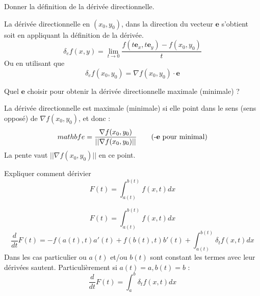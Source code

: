\documentclass[12pt]{article}
\newcommand*{\xfield}[1]{\begin{mdframed}\centering #1\end{mdframed}\bigskip}
\newenvironment{note}{}{}
\begin{document}
\begin{note}
\xfield{Donner la définition de la dérivée directionnelle.}
\xfield{La dérivée directionnelle en $(x_0,y_0)$, dans la direction du vecteur $\mathbf{e}$ s'obtient soit en appliquant la définition de la dérivée. 
$$\delta_e f(x,y) = \lim_{t \to 0} \frac{f(t\mathbf{e}_x, t\mathbf{e}_y) - f(x_0,y_0)}{t}$$
Ou en utilisant que
$$\delta_e f(x_0,y_0) = \nabla f(x_0,y_0) \cdot \mathbf{e}$$ }
\end{note}

\begin{note}
\xfield{Quel $\mathbf{e}$ choisir pour obtenir la dérivée directionnelle maximale (minimale) ?}
\xfield{La dérivée directionnelle est maximale (minimale) si elle point dans le sens (sens opposé) de $\nabla f(x_0,y_0)$, et donc :
\begin{align*}
mathbf{e} = \frac{\nabla f(x_0,y_0)}{\vert \vert \nabla f(x_0,y_0) \vert \vert} \tag*{(-$\mathbf{e}$ pour minimal)}
\end{align*}La pente vaut $\vert \vert \nabla f(x_0,y_0) \vert \vert$ en ce point. }
\end{note}
\begin{note}
\xfield{Expliquer comment dérivier $$F(t) = \int_{a(t)}^{b(t)} f(x,t)dx $$}
\xfield{$$F(t) = \int_{a(t)}^{b(t)} f(x,t)dx $$
$$\frac{d}{dt} F(t) = -f(a(t),t)a'(t) + f(b(t),t)b'(t) + \int_{a(t)}^{b(t)} \delta _t f(x,t) dx$$
Dans les cas particulier ou $a(t)$ et/ou $b(t)$ sont constant les termes avec leur dérivées sautent. Particulièrement si $a(t) = a, b(t) = b$ :
$$\frac{d}{dt} F(t) = \int_a^b \delta_t f(x,t)dx$$}
\end{note}
\end{document}
